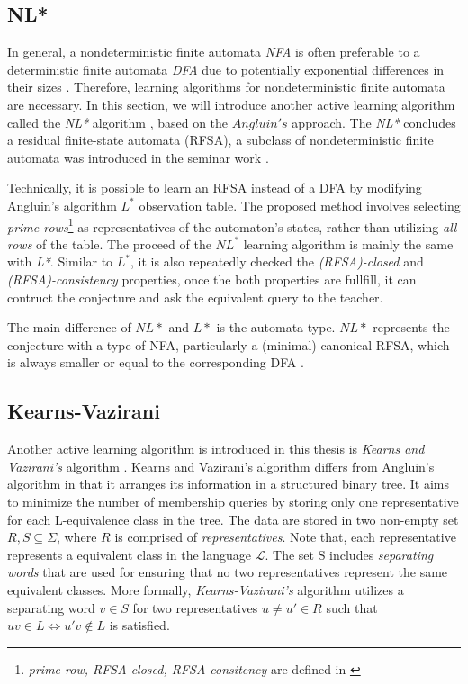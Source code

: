 \subsection{NL*}
In general, a nondeterministic finite automata \textit{NFA} is often preferable to a 
deterministic finite automata \textit{DFA} due to potentially exponential 
differences in their sizes \cite*{ozols2005size}.
Therefore, learning algorithms for nondeterministic finite automata are necessary.
In this section, we will introduce another active learning algorithm called the \textit{NL*} algorithm \cite*{Bollig2009AngluinStyleLO},
based on the $Angluin's$ approach. 
The \textit{NL*} concludes a residual finite-state automata (RFSA), 
a subclass of nondeterministic finite automata was introduced in the seminar work \cite*{10.1007/3-540-44693-1_13}.

Technically, it is possible to learn an RFSA instead of a DFA by modifying Angluin's algorithm $L^*$ observation table.
The proposed method involves selecting \textit{prime rows}\footnote{\label{notenl}\textit{prime row, RFSA-closed, RFSA-consitency} are defined in \cite{Bollig2009AngluinStyleLO}} as representatives of the automaton's states, 
rather than utilizing \textit{all rows} of the table. 
The proceed of the \textit{$NL^*$} learning algorithm is mainly the same with \textit{L*}.
Similar to \textit{$L^*$}, it is also repeatedly checked the \textit{(RFSA)-closed}
and \textit{(RFSA)-consistency} properties, once the both properties are fullfill, 
it can contruct the conjecture and ask the equivalent query to the teacher.

The main difference of $NL*$ and $L*$ is the automata type.
$NL*$ represents the conjecture with a type of NFA, particularly a (minimal) canonical RFSA, which is always smaller or equal to the corresponding DFA \cite*{10.1007/3-540-44693-1_13}.

\subsection{Kearns-Vazirani}
Another active learning algorithm is introduced in this thesis is \textit{Kearns and Vazirani's} algorithm \cite*{kearns1994introduction}.
Kearns and Vazirani’s algorithm differs from Angluin's algorithm in that it arranges its information in a structured binary tree. 
It aims to minimize the number of membership queries by storing only one representative for 
each L-equivalence class in the tree.
The data are stored in two non-empty set $R, S \subseteq \Sigma$, where $R$ is comprised of \textit{representatives}.
Note that, each representative represents a equivalent class in the language $\mathcal{L}$.
The set S includes \textit{separating words} that are used for ensuring that no two representatives represent the same equivalent classes.
More formally, \textit{Kearns-Vazirani's} algorithm utilizes a separating word $v \in S$
for two representatives $u \ne u' \in R$ such that $uv \in L \Leftrightarrow u'v \notin L$ is satisfied.

